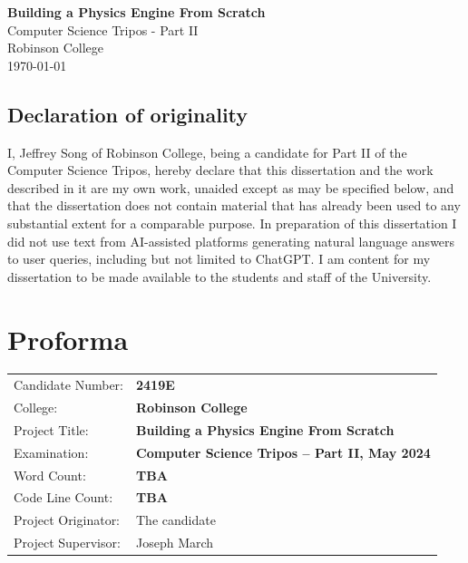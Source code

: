 \documentclass[12pt,a4paper,twoside,openright]{report}
\begin{document}

\pagestyle{empty}
\vspace*{60mm}
\begin{center}
\Huge
\textbf{Building a Physics Engine From Scratch} \\[5mm]
Computer Science Tripos - Part II \\[5mm]
Robinson College \\[5mm]
\today %
\end{center}

\newpage
\section*{Declaration of originality}
I, Jeffrey Song of Robinson College, being a candidate for Part II of the Computer Science Tripos, hereby declare that this dissertation and the work described in it are my own work, unaided except as may be specified below, and that the dissertation does not contain material that has already been used to any substantial extent for a comparable purpose. In preparation of this dissertation I did not use text from AI-assisted platforms generating natural language answers to user queries, including but not limited to ChatGPT. I am content for my dissertation to be made available to the students and staff of the University.
\bigskip
{}
\medskip
{}

\pagestyle{plain}
\chapter*{Proforma}
{\large
\begin{tabular}{ll}
Candidate Number: & \bf 2419E \\
College: & \bf Robinson College \\
Project Title: & \bf Building a Physics Engine From Scratch \\
Examination: & \bf Computer Science Tripos -- Part II, May 2024 \\
Word Count: & \bf TBA\footnotemark[1] \\
Code Line Count: & \bf TBA\footnotemark[2] \\
Project Originator: & The candidate \\
Project Supervisor: & Joseph March \\
\end{tabular}
}
\end{document}
